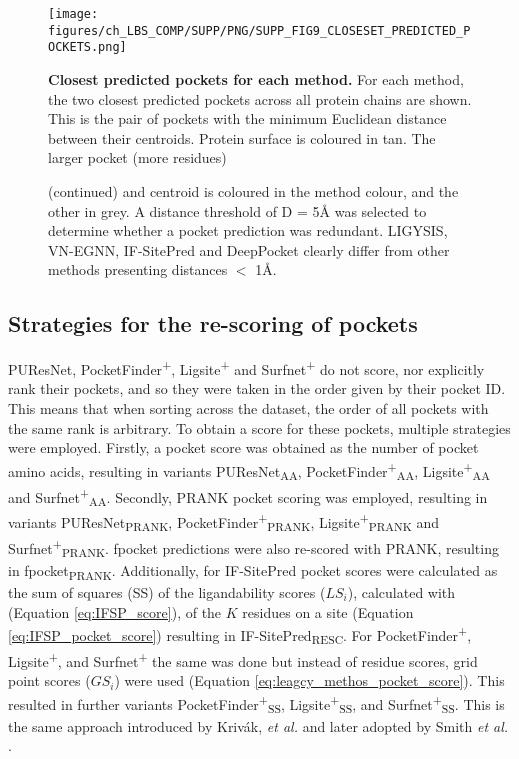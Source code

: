 \begin{figure}[ht!]
    \centering
    \texttt{[image: figures/ch\_LBS\_COMP/SUPP/PNG/SUPP\_FIG9\_CLOSESET\_PREDICTED\_POCKETS.png]}
    \caption[Closest predicted pockets for each methods]{\textbf{Closest predicted pockets for each method.} For each method, the two closest predicted pockets across all protein chains are shown. This is the pair of pockets with the minimum Euclidean distance between their centroids. Protein surface is coloured in tan. The larger pocket (more residues)}
    \label{fig:closest_pred_pockets}
\end{figure}

\begin{figure}[ht!]
\ContinuedFloat
\caption*{(continued)  and centroid is coloured in the method colour, and the other in grey. A distance threshold of D = 5\AA{} was selected to determine whether a pocket prediction was redundant. LIGYSIS, VN-EGNN, IF-SitePred and DeepPocket clearly differ from other methods presenting distances $<$ 1\AA{}.}
\end{figure}

\subsection{Strategies for the re-scoring of pockets}

PUResNet, PocketFinder\textsuperscript{+}, Ligsite\textsuperscript{+} and Surfnet\textsuperscript{+} do not score, nor explicitly rank their pockets, and so they were taken in the order given by their pocket ID. This means that when sorting across the dataset, the order of all pockets with the same rank is arbitrary. To obtain a score for these pockets, multiple strategies were employed. Firstly, a pocket score was obtained as the number of pocket amino acids, resulting in variants PUResNet\textsubscript{AA}, PocketFinder\textsuperscript{+}\textsubscript{AA}, Ligsite\textsuperscript{+}\textsubscript{AA} and Surfnet\textsuperscript{+}\textsubscript{AA}. Secondly, PRANK pocket scoring was employed, resulting in variants PUResNet\textsubscript{PRANK}, PocketFinder\textsuperscript{+}\textsubscript{PRANK}, Ligsite\textsuperscript{+}\textsubscript{PRANK} and Surfnet\textsuperscript{+}\textsubscript{PRANK}. fpocket predictions were also re-scored with PRANK, resulting in fpocket\textsubscript{PRANK}. Additionally, for IF-SitePred pocket scores were calculated as the sum of squares (SS) of the ligandability scores ($LS_{i}$), calculated with (Equation \ref{eq:IFSP_score}), of the $K$ residues on a site (Equation \ref{eq:IFSP_pocket_score}) resulting in IF-SitePred\textsubscript{RESC}. For PocketFinder\textsuperscript{+}, Ligsite\textsuperscript{+}, and Surfnet\textsuperscript{+} the same was done but instead of residue scores, grid point scores ($GS_{i}$) were used (Equation \ref{eq:leagcy_methos_pocket_score}). This resulted in further variants PocketFinder\textsuperscript{+}\textsubscript{SS}, Ligsite\textsuperscript{+}\textsubscript{SS}, and Surfnet\textsuperscript{+}\textsubscript{SS}. This is the same approach introduced by Krivák, \textit{et al.} \cite{KRIVAK_2015_P2RANK} and later adopted by Smith \textit{et al.} \cite{SMITH_2024_GrASP}.

